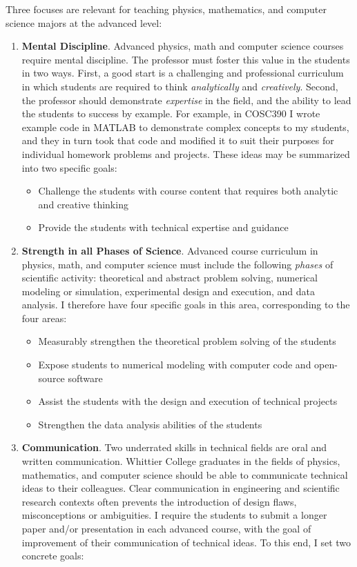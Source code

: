 \documentclass[../../main.tex]{subfiles}
\begin{document}
Three focuses are relevant for teaching physics, mathematics, and computer science majors at the advanced level:
\begin{enumerate}
\item \textbf{Mental Discipline}.  Advanced physics, math and computer science courses require mental discipline.  The professor must foster this value in the students in two ways.  First, a good start is a challenging and professional curriculum in which students are required to think \textit{analytically} and \textit{creatively}.  Second, the professor should demonstrate \textit{expertise} in the field, and the ability to lead the students to success by example.  For example, in COSC390 I wrote example code in MATLAB to demonstrate complex concepts to my students, and they in turn took that code and modified it to suit their purposes for individual homework problems and projects. These ideas may be summarized into two specific goals:

\begin{itemize}
\item Challenge the students with course content that requires both analytic and creative thinking %
\item Provide the students with technical expertise and guidance %
\end{itemize}

\item \textbf{Strength in all Phases of Science}. Advanced course curriculum in physics, math, and computer science must include the following \textit{phases} of scientific activity: theoretical and abstract problem solving, numerical modeling or simulation, experimental design and execution, and data analysis. I therefore have four specific goals in this area, corresponding to the four areas:

\begin{itemize}
\item Measurably strengthen the theoretical problem solving of the students %
\item Expose students to numerical modeling with computer code and open-source software %
\item Assist the students with the design and execution of technical projects %
\item Strengthen the data analysis abilities of the students %
\end{itemize}

\item \textbf{Communication}.  Two underrated skills in technical fields are oral and written communication.  Whittier College graduates in the fields of physics, mathematics, and computer science should be able to communicate technical ideas to their colleagues.  Clear communication in engineering and scientific research contexts often prevents the introduction of design flaws, misconceptions or ambiguities.  I require the students to submit a longer paper and/or presentation in each advanced course, with the goal of improvement of their communication of technical ideas.  To this end, I set two concrete goals:


\end{enumerate}
\end{document}
